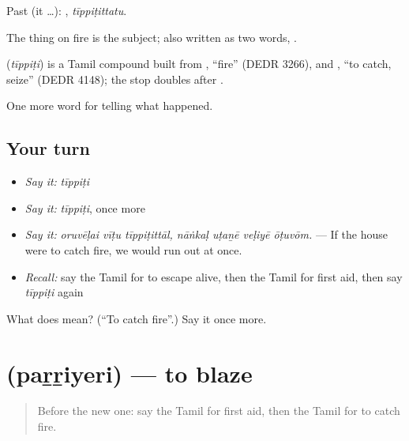 Past (it …): , \emph{tīppiṭittatu}.

The thing on fire is the subject; also written as two words,  .

\begin{cousinweb}
\textbf{} (\emph{tīppiṭi}) is a Tamil compound built from , \textquotedblleft{}fire\textquotedblright{} (DEDR 3266), and , \textquotedblleft{}to catch, seize\textquotedblright{} (DEDR 4148); the stop doubles after .
\end{cousinweb}

\begin{grammarlens}[title={What you've built}]
One more word for telling what happened.
\end{grammarlens}

\subsection*{Your turn}
\begin{itemize}
\raggedright
  \item \emph{Say it:} \emph{tīppiṭi}
  \item \emph{Say it:} \emph{tīppiṭi}, once more
  \item \emph{Say it:} \emph{oruvēḷai vīṭu tīppiṭittāl, nāṅkaḷ uṭaṉē veḷiyē ōṭuvōm.} — If the house were to catch fire, we would run out at once.
  \item \emph{Recall:} say the Tamil for to escape alive, then the Tamil for first aid, then say \emph{tīppiṭi} again
\end{itemize}

\begin{tcolorbox}[breakable,colback=teal!4,colframe=teal!35!black,title={Before you move on}]
What does  mean? (\textquotedblleft{}To catch fire\textquotedblright{}.) Say it once more.
\end{tcolorbox}
\section[\texorpdfstring{\ta{பற்றியெரி} (paṟṟiyeri)}{பற்றியெரி (paṟṟiyeri)}]{ (paṟṟiyeri) — to blaze}

\label{lesson:TA-C299-parriyeri}



\begin{quote}
Before the new one: say the Tamil for first aid, then the Tamil for to catch fire.
\end{quote}

